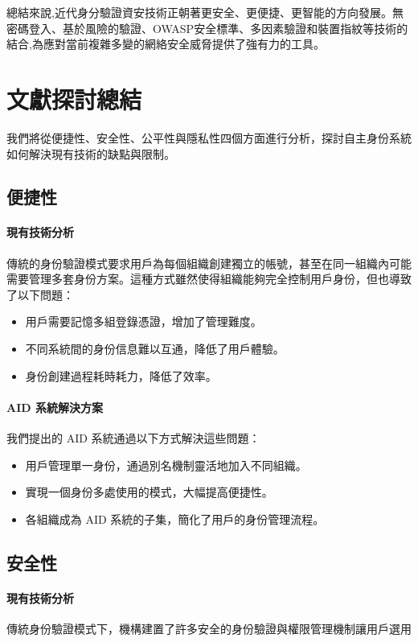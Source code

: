 總結來說,近代身分驗證資安技術正朝著更安全、更便捷、更智能的方向發展。無密碼登入、基於風險的驗證、OWASP安全標準、多因素驗證和裝置指紋等技術的結合,為應對當前複雜多變的網絡安全威脅提供了強有力的工具。


\section{文獻探討總結}

我們將從便捷性、安全性、公平性與隱私性四個方面進行分析，探討自主身份系統如何解決現有技術的缺點與限制。

\subsection{便捷性}

\paragraph{現有技術分析}
傳統的身份驗證模式要求用戶為每個組織創建獨立的帳號，甚至在同一組織內可能需要管理多套身份方案。這種方式雖然使得組織能夠完全控制用戶身份，但也導致了以下問題：

\begin{itemize}
  \item 用戶需要記憶多組登錄憑證，增加了管理難度。
  \item 不同系統間的身份信息難以互通，降低了用戶體驗。
  \item 身份創建過程耗時耗力，降低了效率。
\end{itemize}


\paragraph{AID 系統解決方案}
我們提出的 AID 系統通過以下方式解決這些問題：


\begin{itemize}
  \item 用戶管理單一身份，通過別名機制靈活地加入不同組織。
  \item 實現一個身份多處使用的模式，大幅提高便捷性。
  \item 各組織成為 AID 系統的子集，簡化了用戶的身份管理流程。
\end{itemize}

\subsection{安全性}

\paragraph{現有技術分析}
傳統身份驗證模式下，機構建置了許多安全的身份驗證與權限管理機制讓用戶選用

